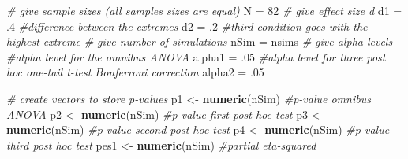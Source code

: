 \documentclass[]{book}
\newenvironment{Shaded}{\begin{snugshade}}{\end{snugshade}}
\newcommand{\CommentTok}[1]{\textcolor[rgb]{0.56,0.35,0.01}{\textit{#1}}}
\newcommand{\DecValTok}[1]{\textcolor[rgb]{0.00,0.00,0.81}{#1}}
\newcommand{\FloatTok}[1]{\textcolor[rgb]{0.00,0.00,0.81}{#1}}
\newcommand{\KeywordTok}[1]{\textcolor[rgb]{0.13,0.29,0.53}{\textbf{#1}}}
\newcommand{\NormalTok}[1]{#1}
\newcommand{\StringTok}[1]{\textcolor[rgb]{0.31,0.60,0.02}{#1}}
\begin{document}
\begin{Shaded}
\begin{Highlighting}[]
\CommentTok{# give sample sizes (all samples sizes are equal)}
\NormalTok{N =}\StringTok{ }\DecValTok{82}
\CommentTok{# give effect size d}
\NormalTok{d1 =}\StringTok{ }\FloatTok{.4} \CommentTok{#difference between the extremes}
\NormalTok{d2 =}\StringTok{ }\FloatTok{.2} \CommentTok{#third condition goes with the highest extreme}
\CommentTok{# give number of simulations}
\NormalTok{nSim =}\StringTok{ }\NormalTok{nsims}
\CommentTok{# give alpha levels}
\CommentTok{#alpha level for the omnibus ANOVA}
\NormalTok{alpha1 =}\StringTok{ }\FloatTok{.05} 
\CommentTok{#alpha level for three post hoc one-tail t-test Bonferroni correction}
\NormalTok{alpha2 =}\StringTok{ }\FloatTok{.05} 
\end{Highlighting}
\end{Shaded}

\begin{Shaded}
\begin{Highlighting}[]
\CommentTok{# create vectors to store p-values}
\NormalTok{p1 <-}\StringTok{ }\KeywordTok{numeric}\NormalTok{(nSim) }\CommentTok{#p-value omnibus ANOVA}
\NormalTok{p2 <-}\StringTok{ }\KeywordTok{numeric}\NormalTok{(nSim) }\CommentTok{#p-value first post hoc test}
\NormalTok{p3 <-}\StringTok{ }\KeywordTok{numeric}\NormalTok{(nSim) }\CommentTok{#p-value second post hoc test}
\NormalTok{p4 <-}\StringTok{ }\KeywordTok{numeric}\NormalTok{(nSim) }\CommentTok{#p-value third post hoc test}
\NormalTok{pes1 <-}\StringTok{ }\KeywordTok{numeric}\NormalTok{(nSim) }\CommentTok{#partial eta-squared}
\end{Highlighting}
\end{Shaded}
\end{document}
